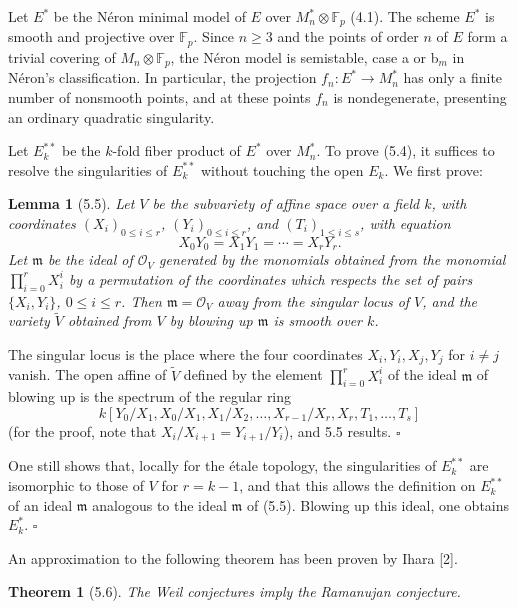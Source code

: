 \documentclass[10pt]{article}
\newcommand{\F}{\mathbb F}
\newcommand{\cO}{\mathcal O}
\newcommand{\QED}{\hfill$\square$}
\newtheorem*{theorem}{Theorem}
\newtheorem*{lemma}{Lemma}
\begin{document}
Let $E^*$ be the Néron minimal model of $E$ over $M_n^*\otimes\F_p$ (4.1). The scheme $E^*$ is smooth and projective over $\F_p$. Since $n\ge 3$ and the points of order $n$ of $E$ form a trivial covering of $M_n\otimes\F_p$, the Néron model is semistable, case a or b$_m$ in Néron's classification. In particular, the projection $f_n:E^*\to M_n^*$ has only a finite number of nonsmooth points, and at these points $f_n$ is nondegenerate, presenting an ordinary quadratic singularity.

Let $E_k^{**}$ be the $k$-fold fiber product of $E^*$ over $M_n^*$. To prove (5.4), it suffices to resolve the singularities of $E_k^{**}$ without touching the open $E_k$. We first prove:

\begin{lemma}[5.5]
Let $V$ be the subvariety of affine space over a field $k$, with coordinates $(X_i)_{0\le i\le r}$, $(Y_i)_{0\le i\le r}$, and $(T_i)_{1\le i\le s}$, with equation
\[
X_0Y_0=X_1Y_1=\cdots=X_rY_r.
\]
Let $\mathfrak m$ be the ideal of $\cO_V$ generated by the monomials obtained from the monomial $\prod_{i=0}^r X_i^i$ by a permutation of the coordinates which respects the set of pairs $\{X_i,Y_i\}$, $0\le i\le r$. Then $\mathfrak m=\cO_V$ away from the singular locus of $V$, and the variety $\widetilde V$ obtained from $V$ by blowing up $\mathfrak m$ is smooth over $k$.
\end{lemma}

The singular locus is the place where the four coordinates $X_i,Y_i,X_j,Y_j$ for $i\ne j$ vanish. The open affine of $\widetilde V$ defined by the element $\prod_{i=0}^r X_i^i$ of the ideal $\mathfrak m$ of blowing up is the spectrum of the regular ring
\[
k[Y_0/X_1, X_0/X_1, X_1/X_2,\ldots,X_{r-1}/X_r,X_r,T_1,\ldots,T_s]
\]
(for the proof, note that $X_i/X_{i+1}=Y_{i+1}/Y_i$), and 5.5 results. \QED

One still shows that, locally for the étale topology, the singularities of $E_k^{**}$ are isomorphic to those of $V$ for $r=k-1$, and that this allows the definition on $E_k^{**}$ of an ideal $\mathfrak m$ analogous to the ideal $\mathfrak m$ of (5.5). Blowing up this ideal, one obtains $E_k^*$. \QED

An approximation to the following theorem has been proven by Ihara [2].

\begin{theorem}[5.6]
The Weil conjectures imply the Ramanujan conjecture.
\end{theorem}
\end{document}
